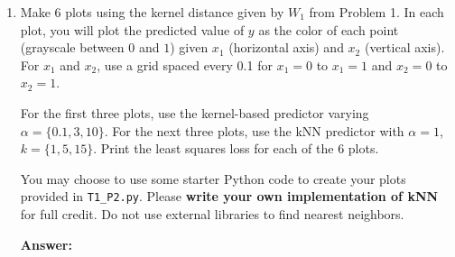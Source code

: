 \documentclass[submit]{harvardml}
\begin{document}
\begin{enumerate}

\item Make 6 plots using the kernel distance given by $W_1$ from Problem 1.  In each plot,
  you will plot the predicted value of $y$ as the color of each point (grayscale between $0$ and $1$) given $x_1$
  (horizontal axis) and $x_2$ (vertical axis).  For $x_1$ and $x_2$,
  use a grid spaced every 0.1 for $x_1=0$ to $x_1=1$ and $x_2=0$ to
  $x_2=1$.  
  
  For the first three plots, use the kernel-based predictor
  varying $\alpha = \{0.1,3,10\}$.  For the next three plots, use
  the kNN predictor with $\alpha = 1$, $k=\{1,5,15\}$.  Print the least squares loss for each of the 6 plots.
  
  You may choose to use some starter Python code to create your plots provided in \verb|T1_P2.py|.  Please \textbf{write your own implementation of kNN} for full credit.  Do not use external libraries to find nearest neighbors.

\textbf{Answer:} 


\end{enumerate}
\end{document}

